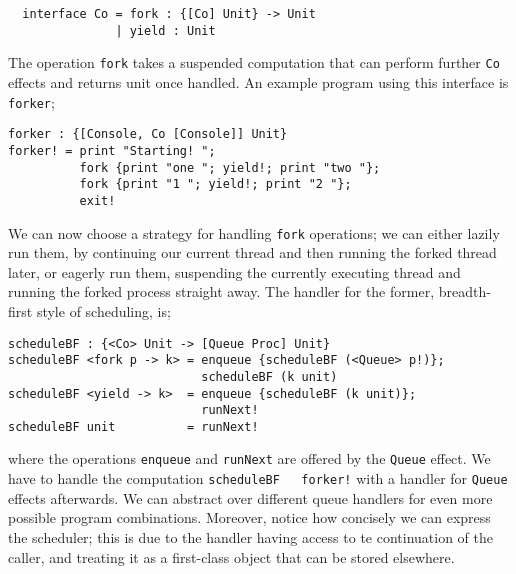 \documentclass[msc,deptreport,cs]{infthesis} %
\newcommand{\code}[1]{\lstinline{#1}}
\begin{document}
\begin{lstlisting}
  interface Co = fork : {[Co] Unit} -> Unit
               | yield : Unit
\end{lstlisting}

The operation \code{fork} takes a suspended computation that can perform further
\code{Co} effects and returns unit once handled. An example program using this
interface is \code{forker};

\begin{lstlisting}
forker : {[Console, Co [Console]] Unit}
forker! = print "Starting! ";
          fork {print "one "; yield!; print "two "};
          fork {print "1 "; yield!; print "2 "};
          exit!
\end{lstlisting}

We can now choose a strategy for handling \code{fork} operations; we can either
lazily run them, by continuing our current thread and then running the forked
thread later, or eagerly run them, suspending the currently executing thread and
running the forked process straight away. The handler for the former,
breadth-first style of scheduling, is;

\begin{lstlisting}
scheduleBF : {<Co> Unit -> [Queue Proc] Unit}
scheduleBF <fork p -> k> = enqueue {scheduleBF (<Queue> p!)};
                           scheduleBF (k unit)
scheduleBF <yield -> k>  = enqueue {scheduleBF (k unit)};
                           runNext!
scheduleBF unit          = runNext!
\end{lstlisting}

\noindent where the operations \code{enqueue} and \code{runNext} are offered by
the \code{Queue} effect. We have to handle the computation \code{scheduleBF
  forker!} with a handler for \code{Queue} effects afterwards. We can abstract
over different queue handlers for even more possible program combinations.
Moreover, notice how concisely we can express the scheduler; this is due to the
handler having access to te continuation of the caller, and treating it as a
first-class object that can be stored elsewhere.


\end{document}
